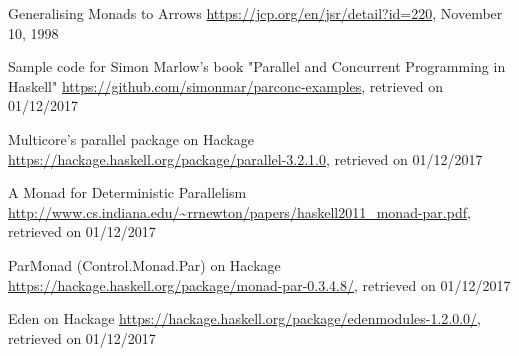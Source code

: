 \begin{thebibliography}{100}
	
	 Generalising Monads to Arrows
	\url{https://jcp.org/en/jsr/detail?id=220}, November 10, 1998
	
	 Sample code for Simon Marlow's book "Parallel and Concurrent Programming in Haskell"
	\url{https://github.com/simonmar/parconc-examples}, retrieved on 01/12/2017
	
	 Multicore's parallel package on Hackage
	\url{https://hackage.haskell.org/package/parallel-3.2.1.0}, retrieved on 01/12/2017
	
	 A Monad for Deterministic Parallelism
	\url{http://www.cs.indiana.edu/~rrnewton/papers/haskell2011_monad-par.pdf}, retrieved on 01/12/2017
	
	 ParMonad (Control.Monad.Par) on Hackage
	\url{https://hackage.haskell.org/package/monad-par-0.3.4.8/}, retrieved on 01/12/2017
	
	 Eden on Hackage
	\url{https://hackage.haskell.org/package/edenmodules-1.2.0.0/}, retrieved on 01/12/2017
\end{thebibliography}